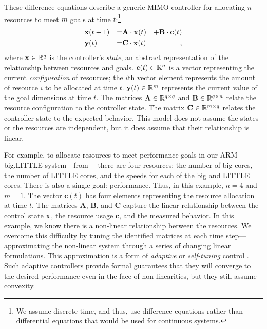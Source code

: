 These difference equations describe a generic MIMO controller for
allocating $n$ resources to meet $m$ goals at time $t$:\footnote{We
  assume discrete time, and thus, use difference equations rather than
  differential equations that would be used for continuous systems.}
\begin{equation}
\begin{aligned}
&\mathbf{x}(t+1) &=& \mathbf{A} \cdot \mathbf{x}(t)& + \mathbf{B} \cdot \mathbf{c}(t)\\
&\mathbf{y}(t)   &=& \mathbf{C} \cdot \mathbf{x}(t)&,
\end{aligned}
\label{eqn:system:mimo}
\end{equation}
where $\mathbf{x} \in \mathbb{R}^{q}$ is the controller's \emph{state}, an abstract
representation of the relationship between resources and goals.
$\mathbf{c}(t) \in \mathbb{R}^n$ is a vector representing the current
\emph{configuration} of resources; \ie{} the $i$th vector element
represents the amount of resource $i$ to be allocated at time $t$.
$\mathbf{y}(t) \in \mathbb{R}^{m}$ represents the current value of the goal dimensions
at time $t$. The matrices $\mathbf{A} \in \mathbb{R}^{q \times q}$ and
$\mathbf{B} \in \mathbb{R}^{q \times n}$ relate the resource configuration to
the controller state.  The matrix $\mathbf{C} \in \mathbb{R}^{m \times q}$
relates the controller state to the expected behavior.  This model
does not assume the states or the resources are independent, but it
does assume that their relationship is linear.

For example, to allocate resources to meet performance goals in our
ARM big.LITTLE system---from ---there are four
resources: the number of big cores, the number of LITTLE cores, and
the speeds for each of the big and LITTLE cores.  There is also a
single goal: performance.  Thus, in this example, $n=4$ and $m=1$. The
vector $\mathbf{c}(t)$ has four elements representing the resource
allocation at time $t$.  The matrices $\mathbf{A}$, $\mathbf{B}$, and
$\mathbf{C}$ capture the linear relationship between the control state
$\mathbf{x}$, the resource usage $\mathbf{c}$, and the measured behavior.  In
this example, we know there is a non-linear relationship between the
resources.  We overcome this difficulty by tuning the identified
matrices at each time step---approximating the non-linear system
through a series of changing linear formulations.  This approximation
is a form of \emph{adaptive} or \emph{self-tuning} control
\cite{AdaptiveControl}.  Such adaptive controllers provide formal
guarantees that they will converge to the desired performance even in
the face of non-linearities, but they still assume convexity.

